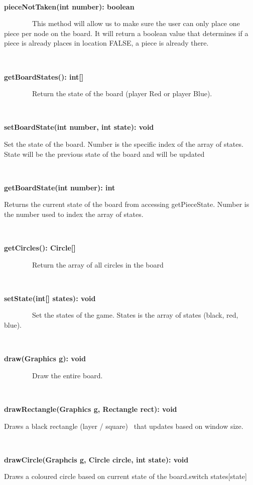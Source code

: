 \documentclass{article}
\begin{document}
{{~~~~~~~~~~~~~~~~}

{\textbf{pieceNotTaken(int number): boolean}}

{~~~~~~~~This method will allow us to make sure the user can only place
one piece per node on the board. It will return a boolean value that determines if a piece is
already places in location FALSE, a piece is already there.}

{}

{~~~~~~~~~~~~~~~~}

{\textbf{getBoardStates(): int{[}{]}}}

{~~~~~~~~Return the state of the board (player Red or player Blue).}

{~~~~~~~~~~~~~~~~}

{\textbf{setBoardState(int number, int state): void}}

{Set the state of the board. Number is the specific index of the array
of states. State will be the previous state of the board and will be
updated}

{~}

{\textbf{getBoardState(int number): int}}

{Returns the current state of the board from accessing getPieceState.
Number is the number used to index the array of states.}

{~~~~~~~~~~~~~~~~}

{\textbf{getCircles(): Circle{[}{]}}}

{~~~~~~~~Return the array of all circles in the board}

{~~~~~~~~~~~~~~~~}

{\textbf{setState(int{[}{]} states): void}}

{~~~~~~~~Set the states of the game. States is the array of states
(black, red, blue).}

{~~~~~~~~~~~~~~~~}

{\textbf{draw(Graphics g): void}}

{~~~~~~~~Draw the entire board. }

{~~~~~~~~~~~~~~~~}

{\textbf{drawRectangle(Graphics g, Rectangle rect): void}}

{Draws a black rectangle (layer / square) ~that updates based on window
size.}

{~~~~~~~~~~~~~~~~}

{\textbf{drawCircle(Graphcis g, Circle circle, int state): void}}

{Draws a coloured circle based on current state of the board.}{switch
states{[}state{]}}

}
\end{document}
